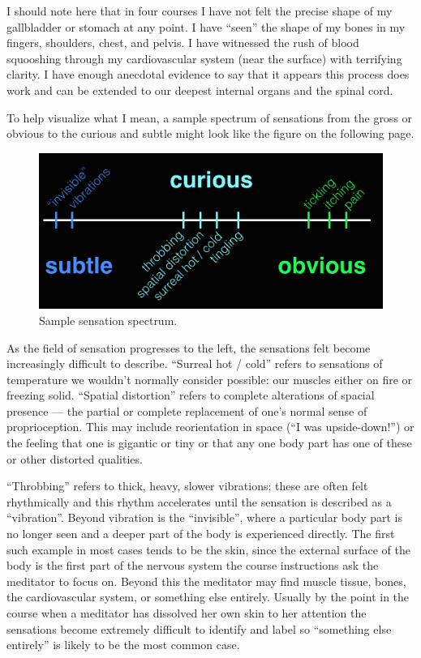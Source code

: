 \documentclass{article}
\begin{document}
I should note here that in four courses I have not felt the precise shape of my gallbladder or stomach at any point. I have ``seen'' the shape of my bones in my fingers, shoulders, chest, and pelvis. I have witnessed the rush of blood squooshing through my cardiovascular system (near the surface) with terrifying clarity. I have enough anecdotal evidence to say that it appears this process does work and can be extended to our deepest internal organs and the spinal cord.

To help visualize what I mean, a sample spectrum of sensations from the gross or obvious to the curious and subtle might look like the figure on the following page.

\begin{figure}[h]
  \centering
  \includegraphics[width=\linewidth]{images/sensation-spectrum.jpeg}
  \caption{Sample sensation spectrum.}
  \label{fig:sensation-spectrum}
\end{figure}

As the field of sensation progresses to the left, the sensations felt become increasingly difficult to describe. ``Surreal hot / cold'' refers to sensations of temperature we wouldn’t normally consider possible: our muscles either on fire or freezing solid. ``Spatial distortion'' refers to complete alterations of spacial presence — the partial or complete replacement of one’s normal sense of proprioception. This may include reorientation in space (``I was upside-down!'') or the feeling that one is gigantic or tiny or that any one body part has one of these or other distorted qualities.

``Throbbing'' refers to thick, heavy, slower vibrations; these are often felt rhythmically and this rhythm accelerates until the sensation is described as a ``vibration''. Beyond vibration is the ``invisible'', where a particular body part is no longer seen and a deeper part of the body is experienced directly. The first such example in most cases tends to be the skin, since the external surface of the body is the first part of the nervous system the course instructions ask the meditator to focus on. Beyond this the meditator may find muscle tissue, bones, the cardiovascular system, or something else entirely. Usually by the point in the course when a meditator has dissolved her own skin to her attention the sensations become extremely difficult to identify and label so ``something else entirely'' is likely to be the most common case.
\end{document}
